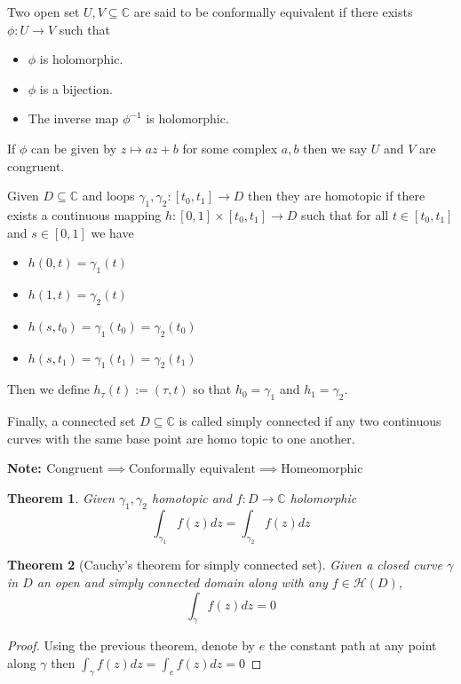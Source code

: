 \documentclass[11pt]{article}
\newcommand{\defeq}{:=}
\newcommand{\C}{\mathbb{C}}
\newenvironment{defin}
	{\begin{mdframed}[backgroundcolor=white, roundcorner=5pt, linewidth=1pt]}
	{\end{mdframed}}
\newcommand{\mdf}[1]{{\color{red} #1}}
\newenvironment{note}
	{\begin{mdframed}[backgroundcolor=white, linecolor=red, roundcorner=5pt, linewidth=1pt]\bfseries{Note:}\normalfont}
	{\end{mdframed}}
\newtheorem{theorem}{Theorem}[section]
\begin{document}
\begin{defin}
	Two open set $U, V\subseteq\C$ are said to be \mdf{conformally equivalent} if there exists $\phi:U \to V$ such that
	\begin{itemize}
		\item $\phi$ is holomorphic.
		\item $\phi$ is a bijection.
		\item The inverse map $\phi^{-1}$ is holomorphic.
	\end{itemize}
	If $\phi$ can be given by $z\mapsto az+b$ for some complex $a, b$ then we say $U$ and $V$ are \mdf{congruent}.

	Given $D\subseteq\C$ and loops $\gamma_1, \gamma_2:[t_0, t_1]\to D$ then they are \mdf{homotopic} if there exists a continuous mapping $h:[0, 1]\times[t_0, t_1]\to D$ such that for all $t\in[t_0, t_1]$ and $s\in[0, 1]$ we have
	\begin{itemize}
		\item $h(0, t)= \gamma_1(t)$
		\item $h(1, t)=\gamma_2(t)$
		\item $h(s, t_0)=\gamma_1(t_0)=\gamma_2(t_0)$
		\item $h(s, t_1)= \gamma_1(t_1)=\gamma_2(t_1)$
	\end{itemize}
	Then we define $h_\tau(t)\defeq(\tau, t)$ so that $h_0=\gamma_1$ and $h_1=\gamma_2$.

	Finally, a connected set $D\subseteq\C$ is called \mdf{simply connected} if any two continuous curves with the same base point are homo topic to one another. 
\end{defin}
\begin{note}
	$\text{Congruent}\implies\text{Conformally equivalent}\implies\text{Homeomorphic}$
\end{note}

\begin{theorem}
Given $\gamma_1, \gamma_2$ homotopic and $f:D\to\C$ holomorphic
\[
	\int_{ \gamma_1 }f(z) dz = \int_{\gamma_2 }f(z)dz
\]
\end{theorem}

\begin{theorem}[Cauchy's theorem for simply connected set]
Given a closed curve $\gamma$ in $D$ an open and simply connected domain along with any $f\in\mathcal{H}(D)$,
\[
	\int_\gamma f(z)dz=0
\]
\end{theorem}

\begin{proof}
Using the previous theorem, denote by $e$ the constant path at any point along $\gamma$ then
$\int_\gamma f(z)dz = \int_e f(z)dz =0$
\end{proof}
\end{document}

